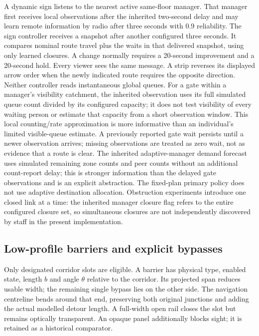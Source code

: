 \documentclass[11pt,a4paper]{article}
\begin{document}
A dynamic sign listens to the nearest active same-floor manager. That manager first receives local observations after the inherited two-second delay and may learn remote information by radio after three seconds with 0.9 reliability. The sign controller receives a snapshot after another configured three seconds. It compares nominal route travel plus the waits in that delivered snapshot, using only learned closures. A change normally requires a 20-second improvement and a 20-second hold. Every viewer sees the same message. A strip reverses its displayed arrow order when the newly indicated route requires the opposite direction. Neither controller reads instantaneous global queues. For a gate within a manager’s visibility catchment, the inherited observation uses its full simulated queue count divided by its configured capacity; it does not test visibility of every waiting person or estimate that capacity from a short observation window. This local counting/rate approximation is more informative than an individual’s limited visible-queue estimate. A previously reported gate wait persists until a newer observation arrives; missing observations are treated as zero wait, not as evidence that a route is clear. The inherited adaptive-manager demand forecast uses simulated remaining zone counts and peer counts without an additional count-report delay; this is stronger information than the delayed gate observations and is an explicit abstraction. The fixed-plan primary policy does not use adaptive destination allocation. Obstruction experiments introduce one closed link at a time: the inherited manager closure flag refers to the entire configured closure set, so simultaneous closures are not independently discovered by staff in the present implementation.


\subsection{Low-profile barriers and explicit bypasses}

Only designated corridor slots are eligible. A barrier has physical type, enabled state, length $b$ and angle $\theta$ relative to the corridor. Its projected span reduces usable width; the remaining single bypass lies on the other side. The navigation centreline bends around that end, preserving both original junctions and adding the actual modelled detour length. A full-width open rail closes the slot but remains optically transparent. An opaque panel additionally blocks sight; it is retained as a historical comparator.
\end{document}
